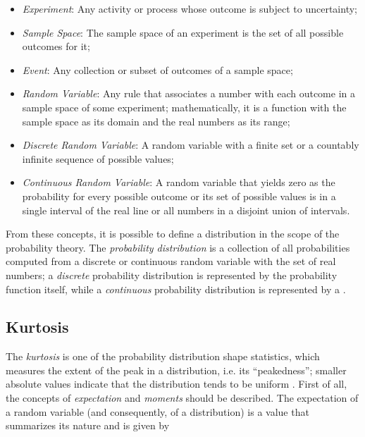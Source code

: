 \begin{itemize}
    \item \emph{Experiment}: Any activity or process whose outcome is subject to uncertainty;
    
    \item \emph{Sample Space}: The sample space of an experiment is the set of all possible outcomes for it;
    
    \item \emph{Event}: Any collection or subset of outcomes of a sample space;
    
    \item \emph{Random Variable}: Any rule that associates a number with each outcome in a sample space of some experiment; mathematically, it is a function with the sample space as its domain and the real numbers as its range;
    
    \item \emph{Discrete Random Variable}: A random variable with a finite set or a countably infinite sequence of possible values;
    
    \item \emph{Continuous Random Variable}: A random variable that yields zero as the probability for every possible outcome or its set of possible values is in a single interval of the real line or all numbers in a disjoint union of intervals.
    
\end{itemize}

From these concepts, it is possible to define a distribution in the scope of the probability theory. The \emph{probability distribution} is a collection of all probabilities computed from a  discrete or continuous random variable with the set of real numbers; a \emph{discrete} probability distribution is represented by the probability function itself, while a \emph{continuous} probability distribution is represented by a  \cite{mendenhall2016statistics}.

\subsection{Kurtosis}

The \emph{kurtosis} is one of the probability distribution shape statistics, which measures the extent of the peak in a distribution, i.e. its ``peakedness''; smaller absolute values indicate that the distribution tends to be uniform \cite{zwillinger1999crc}. First of all, the concepts of \emph{expectation} and \emph{moments} should be described. The expectation of a random variable (and consequently, of a distribution) is a value that summarizes its nature and is given by

